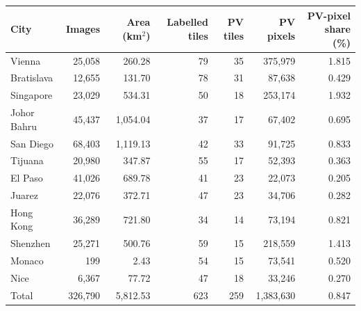 {\scriptsize
\setlength{\tabcolsep}{2pt}
\renewcommand{\arraystretch}{0.95}
\begin{tabular}{@{}lrrrrrr@{}}
\toprule
City & Images &  Area (km$^2$) & Labelled tiles & PV tiles & PV pixels & PV-pixel share (\%) \\
\midrule
Vienna & 25,058 & 260.28 & 79 & 35 & 375,979 & 1.815 \\
Bratislava & 12,655 & 131.70 & 78 & 31 & 87,638 & 0.429 \\
Singapore & 23,029 & 534.31 & 50 & 18 & 253,174 & 1.932 \\
Johor Bahru & 45,437 & 1,054.04 & 37 & 17 & 67,402 & 0.695 \\
San Diego & 68,403 & 1,119.13 & 42 & 33 & 91,725 & 0.833 \\
Tijuana & 20,980 & 347.87 & 55 & 17 & 52,393 & 0.363 \\
El Paso & 41,026 & 689.78 & 41 & 23 & 22,073 & 0.205 \\
Juarez & 22,076 & 372.71 & 47 & 23 & 34,706 & 0.282 \\
Hong Kong & 36,289 & 721.80 & 34 & 14 & 73,194 & 0.821 \\
Shenzhen & 25,271 & 500.76 & 59 & 15 & 218,559 & 1.413 \\
Monaco & 199 & 2.43 & 54 & 15 & 73,541 & 0.520 \\
Nice & 6,367 & 77.72 & 47 & 18 & 33,246 & 0.270 \\
\midrule
Total & 326,790 & 5,812.53 & 623 & 259 & 1,383,630 & 0.847 \\
\bottomrule
\end{tabular}
}
